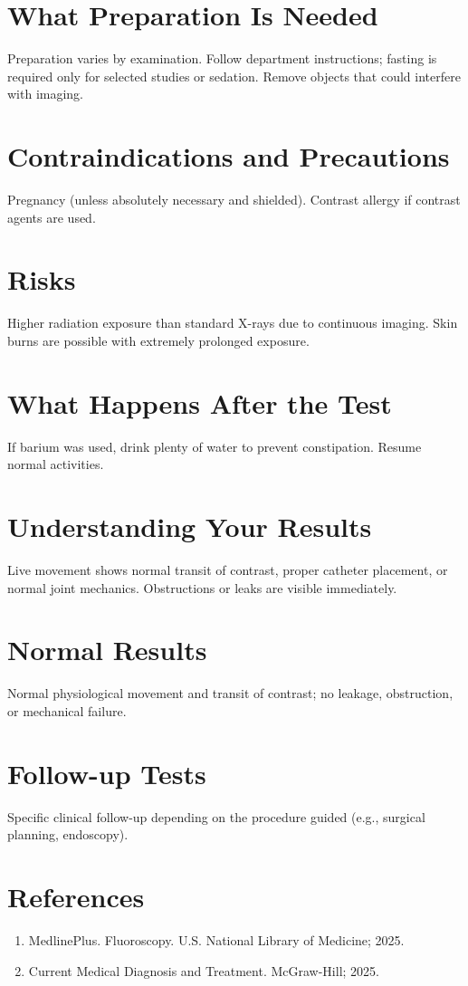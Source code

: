 \section*{What Preparation Is Needed}
Preparation varies by examination. Follow department instructions; fasting is required only for selected studies or sedation. Remove objects that could interfere with imaging.

\section*{Contraindications and Precautions}
Pregnancy (unless absolutely necessary and shielded). Contrast allergy if contrast agents are used.

\section*{Risks}
Higher radiation exposure than standard X-rays due to continuous imaging. Skin burns are possible with extremely prolonged exposure.

\section*{What Happens After the Test}
If barium was used, drink plenty of water to prevent constipation. Resume normal activities.

\section*{Understanding Your Results}
Live movement shows normal transit of contrast, proper catheter placement, or normal joint mechanics. Obstructions or leaks are visible immediately.

\section*{Normal Results}
Normal physiological movement and transit of contrast; no leakage, obstruction, or mechanical failure.

\section*{Follow-up Tests}
Specific clinical follow-up depending on the procedure guided (e.g., surgical planning, endoscopy).

\section*{References}
\begin{enumerate}
  \item MedlinePlus. Fluoroscopy. U.S. National Library of Medicine; 2025.
  \item Current Medical Diagnosis and Treatment. McGraw-Hill; 2025.
\end{enumerate}

\clearpage
